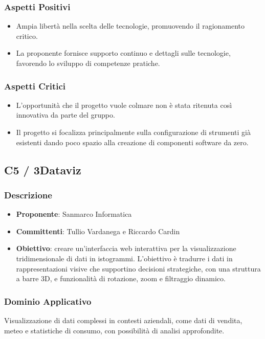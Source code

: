 \documentclass[a4paper, 12pt]{article}
\begin{document}
\subsubsection{Aspetti Positivi}
\begin{itemize}
    \item Ampia libertà nella scelta delle tecnologie, promuovendo il ragionamento critico.
    \item La proponente fornisce supporto continuo e dettagli sulle tecnologie, favorendo lo sviluppo di competenze pratiche.
\end{itemize}

\subsubsection{Aspetti Critici}
\begin{itemize}
    \item L’opportunità che il progetto vuole colmare non è stata ritenuta così innovativa da parte del gruppo.
    \item Il progetto si focalizza principalmente sulla configurazione di strumenti già esistenti dando poco spazio alla creazione di componenti software da zero.
\end{itemize}

\subsection{C5 / 3Dataviz}
\subsubsection{Descrizione}
\begin{itemize}
    \item \textbf{Proponente}: Sanmarco Informatica
    \item \textbf{Committenti}: Tullio Vardanega e Riccardo Cardin
    \item \textbf{Obiettivo}: creare un'interfaccia web interattiva per la visualizzazione tridimensionale di dati in istogrammi. L’obiettivo è tradurre i dati in rappresentazioni visive che supportino decisioni strategiche, con una struttura a barre 3D, e funzionalità di rotazione, zoom e filtraggio dinamico.

\end{itemize}

\subsubsection{Dominio Applicativo}
Visualizzazione di dati complessi in contesti aziendali, come dati di vendita, meteo e statistiche di consumo, con possibilità di analisi approfondite.
\end{document}
